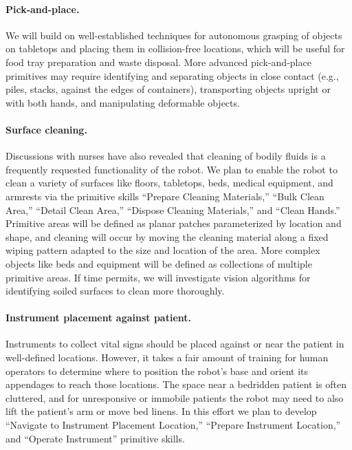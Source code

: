 \paragraph{Pick-and-place.}  We will build on well-established techniques for autonomous grasping of objects on tabletops and placing them in collision-free locations, which will be useful for food tray preparation and waste disposal.   More advanced pick-and-place primitives may require identifying and separating objects in close contact (e.g., piles, stacks, against the edges of containers), transporting objects upright or with both hands, and manipulating deformable objects.

\paragraph{Surface cleaning.}  Discussions with nurses have also revealed that cleaning of bodily fluids is a frequently requested functionality of the robot.  We plan to enable the robot to clean a variety of surfaces like floors, tabletops, beds, medical equipment, and armrests via the primitive skills ``Prepare Cleaning Materials,'' ``Bulk Clean Area,'' ``Detail Clean Area,'' ``Dispose Cleaning Materials,'' and ``Clean Hands.'' Primitive areas will be defined as planar patches parameterized by location and shape, and cleaning will occur by moving the cleaning material along a fixed wiping pattern adapted to the size and location of the area.  More complex objects like beds and equipment will be defined as collections of multiple primitive areas.  If time permits, we will investigate vision algorithms for identifying soiled surfaces to clean more thoroughly.

\paragraph{Instrument placement against patient.} Instruments to collect vital signs should be placed against or near the patient in well-defined locations.  However, it takes a fair amount of training for human operators to determine where to position the robot's base and orient its appendages to reach those locations. The space near a bedridden patient is often cluttered, and for unresponsive or immobile patients the robot may need to also lift the patient's arm or move bed linens.  In this effort we plan to develop ``Navigate to Instrument Placement Location,'' ``Prepare Instrument Location,'' and ``Operate Instrument'' primitive skills.

